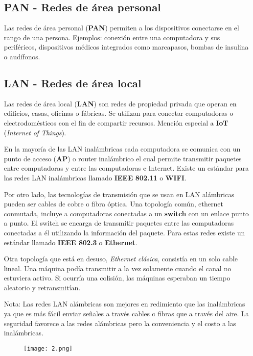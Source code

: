 \documentclass{book}
\begin{document}
	\pagebreak
	\subsection{PAN - Redes de área personal}
	Las redes de área personal (\textbf{PAN}) permiten a los dispositivos conectarse en el rango de una persona. Ejemplos: conexión entre una computadora y sus periféricos, dispositivos médicos integrados como marcapasos, bombas de insulina o audífonos.
	
	\subsection{LAN - Redes de área local}
	Las redes de área local (\textbf{LAN}) son redes de propiedad privada que operan en edificios, casas, oficinas o fábricas. Se utilizan para conectar computadoras o electrodomésticos con el fin de compartir recursos. Mención especial a \textbf{IoT} (\textit{Internet of Things}).
	
	En la mayoría de las LAN inalámbricas cada computadora se comunica con un punto de acceso (\textbf{AP}) o router inalámbrico el cual permite transmitir paquetes entre computadoras y entre las computadoras e Internet. Existe un estándar para las redes LAN inalámbricas llamado \textbf{IEEE 802.11} o \textbf{WIFI}.
	
	Por otro lado, las tecnologías de transmisión que se usan en LAN alámbricas pueden ser cables de cobre o fibra óptica. Una topología común, ethernet conmutada, incluye a computadoras conectadas a un \textbf{switch} con un enlace punto a punto. El switch se encarga de transmitir paquetes entre las computadoras conectadas a él utilizando la información del paquete. Para estas redes existe un estándar llamado \textbf{IEEE 802.3} o \textbf{Ethernet}.
	
	Otra topología que está en desuso, \textit{Ethernet clásica}, consistía en un solo cable lineal. Una máquina podía transmitir a la vez solamente cuando el canal no estuviera activo. Si ocurría una colisión, las máquinas esperaban un tiempo aleatorio y retransmitían.
	
	Nota: Las redes LAN alámbricas son mejores en redimiento que las inalámbricas ya que es más fácil enviar señales a través cables o fibras que a través del aire. La seguridad favorece a las redes alámbricas pero la conveniencia y el costo a las inalámbricas.
	
	\begin{figure}[H]
		\centering
		\texttt{[image: 2.png]}
	\end{figure}
	
\end{document}
